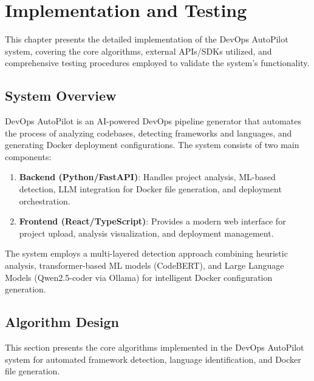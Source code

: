 
\chapter{Implementation and Testing}

This chapter presents the detailed implementation of the DevOps AutoPilot system, covering the core algorithms, external APIs/SDKs utilized, and comprehensive testing procedures employed to validate the system's functionality.

\section{System Overview}

DevOps AutoPilot is an AI-powered DevOps pipeline generator that automates the process of analyzing codebases, detecting frameworks and languages, and generating Docker deployment configurations. The system consists of two main components:

\begin{enumerate}
    \item \textbf{Backend (Python/FastAPI)}: Handles project analysis, ML-based detection, LLM integration for Docker file generation, and deployment orchestration.
    \item \textbf{Frontend (React/TypeScript)}: Provides a modern web interface for project upload, analysis visualization, and deployment management.
\end{enumerate}

The system employs a multi-layered detection approach combining heuristic analysis, transformer-based ML models (CodeBERT), and Large Language Models (Qwen2.5-coder via Ollama) for intelligent Docker configuration generation.

\section{Algorithm Design}

This section presents the core algorithms implemented in the DevOps AutoPilot system for automated framework detection, language identification, and Docker file generation.

